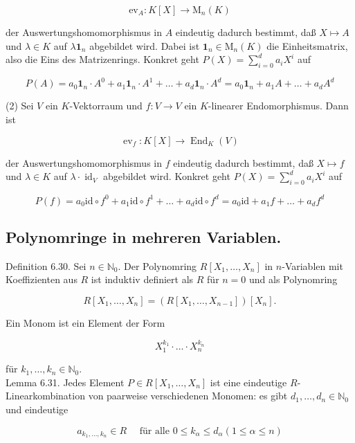 \documentclass[10pt, letterpaper]{article}
\begin{document}
$$
\mathrm{ev}_{A}: K[X] \rightarrow \mathrm{M}_{n}(K)
$$

der Auswertungshomomorphismus in $A$ eindeutig dadurch bestimmt, daß $X \mapsto A$ und $\lambda \in K$ auf $\lambda \mathbf{1}_{n}$ abgebildet wird. Dabei ist $\mathbf{1}_{n} \in \mathrm{M}_{n}(K)$ die Einheitsmatrix, also die Eins des Matrizenrings. Konkret geht $P(X)=\sum_{i=0}^{d} a_{i} X^{i}$ auf

$$
P(A)=a_{0} \mathbf{1}_{n} \cdot A^{0}+a_{1} \mathbf{1}_{n} \cdot A^{1}+\ldots+a_{d} \mathbf{1}_{n} \cdot A^{d}=a_{0} \mathbf{1}_{n}+a_{1} A+\ldots+a_{d} A^{d}
$$

(2) Sei $V$ ein $K$-Vektorraum und $f: V \rightarrow V$ ein $K$-linearer Endomorphismus. Dann ist

$$
\operatorname{ev}_{f}: K[X] \rightarrow \operatorname{End}_{K}(V)
$$

der Auswertungshomomorphismus in $f$ eindeutig dadurch bestimmt, daß $X \mapsto f$ und $\lambda \in K$ auf $\lambda \cdot \operatorname{id}_{V}$ abgebildet wird. Konkret geht $P(X)=\sum_{i=0}^{d} a_{i} X^{i}$ auf

$$
P(f)=a_{0} \mathrm{id} \circ f^{0}+a_{1} \mathrm{id} \circ f^{1}+\ldots+a_{d} \mathrm{id} \circ f^{d}=a_{0} \mathrm{id}+a_{1} f+\ldots+a_{d} f^{d}
$$

\subsection*{Polynomringe in mehreren Variablen.}
Definition 6.30. Sei $n \in \mathbb{N}_{0}$. Der Polynomring $R\left[X_{1}, \ldots, X_{n}\right]$ in $n$-Variablen mit Koeffizienten aus $R$ ist induktiv definiert als $R$ für $n=0$ und als Polynomring

$$
R\left[X_{1}, \ldots, X_{n}\right]=\left(R\left[X_{1}, \ldots, X_{n-1}\right]\right)\left[X_{n}\right] .
$$

Ein Monom ist ein Element der Form

$$
X_{1}^{k_{1}} \cdot \ldots \cdot X_{n}^{k_{n}}
$$

für $k_{1}, \ldots, k_{n} \in \mathbb{N}_{0}$.\\
Lemma 6.31. Jedes Element $P \in R\left[X_{1}, \ldots, X_{n}\right]$ ist eine eindeutige $R$-Linearkombination von paarweise verschiedenen Monomen: es gibt $d_{1}, \ldots, d_{n} \in \mathbb{N}_{0}$ und eindeutige

$$
a_{k_{1}, \ldots, k_{n}} \in R \quad \text { für alle } 0 \leq k_{\alpha} \leq d_{\alpha}(1 \leq \alpha \leq n)
$$
\end{document}

